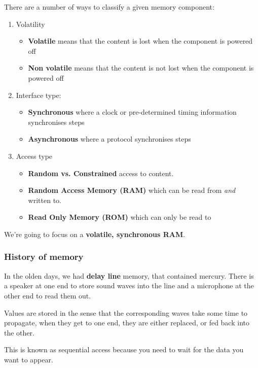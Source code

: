 \documentclass[11pt,a4paper,titlepage,dvipsnames,cmyk]{scrartcl}
\begin{document}
There are a number of ways to classify a given memory component:
\begin{enumerate}
    \item Volatility
    \begin{itemize}
        \item \textbf{Volatile} means that the content is lost when the
            component is powered off
        \item \textbf{Non volatile} means that the content is not lost
            when the component is powered off
    \end{itemize}
    \item Interface type:
    \begin{itemize}
        \item \textbf{Synchronous} where a clock or pre-determined timing
            information synchronises steps
        \item \textbf{Asynchronous} where a protocol synchronises steps
    \end{itemize}
    \item Access type
    \begin{itemize}
        \item \textbf{Random vs. Constrained} access to content.
        \item \textbf{Random Access Memory (RAM)} which can be read from
            \textit{and} written to.
        \item \textbf{Read Only Memory (ROM)} which can only be read to
    \end{itemize}
\end{enumerate}

We're going to focus on a \textbf{volatile, synchronous RAM}.

\subsubsection{History of memory}%
\label{ssub:history-mem}

In the olden days, we had \textbf{delay line} memory, that contained
mercury. There is a speaker at one end to store sound waves into the line
and a microphone at the other end to read them out.

Values are stored in the sense that the corresponding waves take some time
to propagate, when they get to one end, they are either replaced, or fed
back into the other.

This is known as sequential access because you need to wait for the data
you want to appear.
\end{document}
